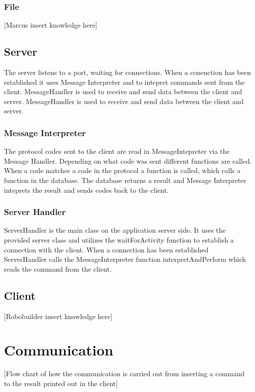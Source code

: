 \documentclass[a4paper, titlepage]{article}
\begin{document}
\subsubsection{File}
[Marcus insert knowledge here]

\subsection{Server}
 The server listens to a port, waiting for connections. When a conenction has been established it uses Message Interpreter and to intepret commands sent from the client. MessageHandler is used to receive and send data between the client and server. MessageHandler is used to receive and send data between the client and server.   

\subsubsection{Message Interpreter}
The protocol codes sent to the client are read in MessageIntepreter via the Message Handler. Depending on what code was sent different functions are called. When a code matches a code in the protocol a function is called, which calls a function in the database. The database returns a result and Message Interpreter inteprets the result and sends codes back to the client.

\subsubsection{Server Handler}
ServerHandler is the main class on the application server side. It uses the provided server class and utilizes the waitForActivity function to establish a connection with the client. When a connection has been established ServerHandler calls the MessageInterpreter function interpretAndPerform which reads the command from the client.

\subsection{Client}
[Robobuilder insert knowledge here]

\section{Communication}\label{communication}
[Flow chart of how the communication is carried out from inserting a command to the result printed out in the client]
\end{document}
